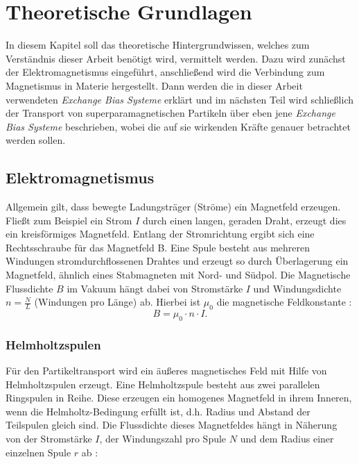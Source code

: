 \documentclass[page,pdftex,12pt,a4paper,twoside,openright]{scrbook}
\begin{document}
\chapter{Theoretische Grundlagen \label{sec-grundlagen}}
\label{sec:orgcb827f9}
In diesem Kapitel soll das theoretische Hintergrundwissen, welches zum Verständnis dieser Arbeit benötigt wird, vermittelt werden. Dazu wird zunächst der Elektromagnetismus eingeführt, anschließend wird die Verbindung zum Magnetismus in Materie hergestellt. Dann werden die in dieser Arbeit verwendeten \emph{Exchange Bias Systeme} erklärt und im nächsten Teil wird schließlich der Transport von superparamagnetischen Partikeln über eben jene \emph{Exchange Bias Systeme} beschrieben, wobei die auf sie wirkenden Kräfte genauer betrachtet werden sollen.\\

\section{Elektromagnetismus \label{sec-elektromagnetismus}}
\label{sec:orgbbab64f}
Allgemein gilt, dass bewegte Ladungsträger (Ströme) ein Magnetfeld erzeugen. Fließt zum Beispiel ein Strom \(I\) durch einen langen, geraden Draht, erzeugt dies ein kreisförmiges Magnetfeld. Entlang der Stromrichtung ergibt sich eine Rechtsschraube für das Magnetfeld B. Eine Spule besteht aus mehreren Windungen stromdurchflossenen Drahtes und erzeugt so durch Überlagerung ein Magnetfeld, ähnlich eines Stabmagneten mit Nord- und Südpol. Die Magnetische Flussdichte \(B\) im Vakuum hängt dabei von Stromstärke \(I\) und Windungsdichte \(n = \frac{N}{L}\) (Windungen pro Länge) ab. Hierbei ist \(\mu_\mathrm{0}\) die magnetische Feldkonstante \cite{demtroder_experimentalphysik_2017}:\\

\begin{equation}
\label{eq-spule}
B = \mu_{\mathrm{0}} \cdot n \cdot I .
\end{equation}

\subsection{Helmholtzspulen}
\label{sec:org6077612}
Für den Partikeltransport wird ein äußeres magnetisches Feld mit Hilfe von Helmholtzspulen erzeugt. Eine Helmholtzspule besteht aus zwei parallelen Ringspulen in Reihe. Diese erzeugen ein homogenes Magnetfeld in ihrem Inneren, wenn die Helmholtz-Bedingung erfüllt ist, d.h. Radius und Abstand der Teilspulen gleich sind. Die Flussdichte dieses Magnetfeldes hängt in Näherung von der Stromstärke \(I\), der Windungszahl pro Spule \(N\) und dem Radius einer einzelnen Spule \(r\) ab \cite{raith_elektromagnetismus_2006}:\\
\end{document}

